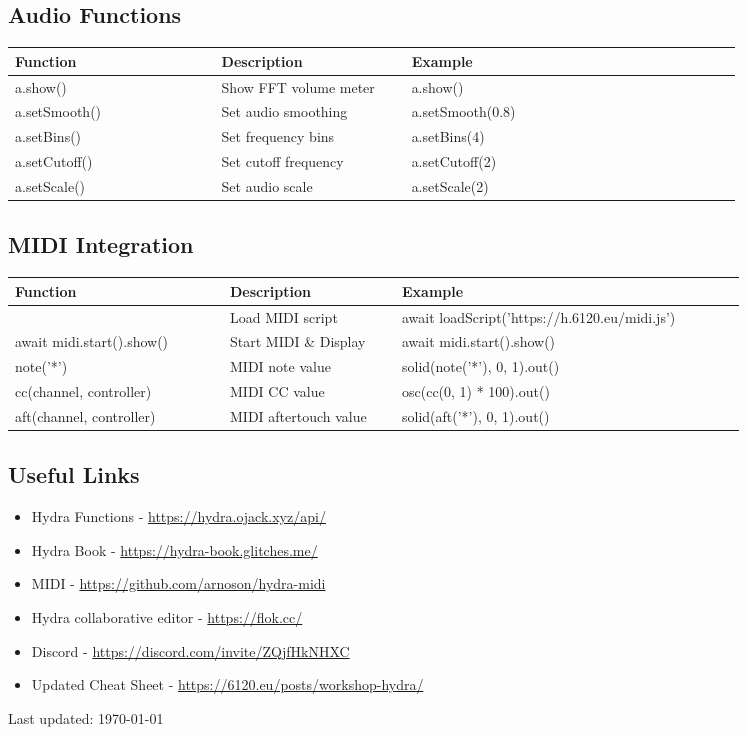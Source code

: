 \documentclass[9pt,oneside]{amsart}
\begin{document}
\subsection*{Audio Functions}
\begin{tabular}{L{0.25\linewidth}L{0.23\linewidth}L{0.40\linewidth}}
\toprule
\textbf{Function} & \textbf{Description} & \textbf{Example} \\
\midrule
a.show() & Show FFT volume meter & a.show() \\
a.setSmooth() & Set audio smoothing & a.setSmooth(0.8) \\
a.setBins() & Set frequency bins & a.setBins(4) \\
a.setCutoff() & Set cutoff frequency & a.setCutoff(2) \\
a.setScale() & Set audio scale & a.setScale(2) \\
\bottomrule
\end{tabular}

\subsection*{MIDI Integration}
\begin{tabular}{L{0.25\linewidth}L{0.20\linewidth}L{0.40\linewidth}}
\toprule
\textbf{Function} & \textbf{Description} & \textbf{Example} \\
\midrule
 & Load MIDI script & await loadScript('https://h.6120.eu/midi.js') \\
await midi.start().show() & Start MIDI \& Display & await midi.start().show() \\
note('*') & MIDI note value & solid(note('*'), 0, 1).out() \\
cc(channel, controller) & MIDI CC value & osc(cc(0, 1) * 100).out() \\
aft(channel, controller) & MIDI aftertouch value & solid(aft('*'), 0, 1).out() \\
\bottomrule
\end{tabular}

\subsection*{Useful Links}
\begin{itemize}
\item Hydra Functions - \url{https://hydra.ojack.xyz/api/}
\item Hydra Book - \url{https://hydra-book.glitches.me/}
\item MIDI - \url{https://github.com/arnoson/hydra-midi}
\item Hydra collaborative editor - \url{https://flok.cc/}
\item Discord - \url{https://discord.com/invite/ZQjfHkNHXC}
\item Updated Cheat Sheet - \url{https://6120.eu/posts/workshop-hydra/}
\end{itemize}

Last updated: \today
\end{document}
